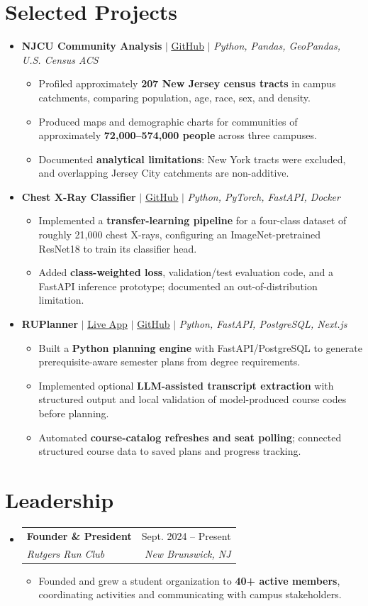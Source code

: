 \documentclass[letterpaper,10pt]{article}
\makeatletter
\newcommand{\resumeItem}[1]{\item\small{#1}}
\newcommand{\resumeSubheading}[4]{
  \vspace{1pt}\item
  \begin{tabular*}{0.97\textwidth}[t]{l@{\extracolsep{\fill}}r}
    \textbf{#1} & #2 \\
    \textit{\small #3} & \textit{\small #4} \\
  \end{tabular*}\vspace{-3pt}
}
\newcommand{\resumeProjectHeading}[1]{\vspace{3pt}\item\small{#1}\vspace{0pt}}
\newcommand{\resumeSubHeadingListStart}{\begin{itemize}[leftmargin=0.15in,label={},itemsep=0pt,topsep=0pt]}
\newcommand{\resumeSubHeadingListEnd}{\end{itemize}}
\newcommand{\resumeItemListStart}{\begin{itemize}[leftmargin=0.15in,label=\textbullet,itemsep=-2pt,topsep=0pt]}
\newcommand{\resumeItemListEnd}{\end{itemize}\vspace{0pt}}
\makeatother
\begin{document}
\section{Selected Projects}
\resumeSubHeadingListStart
  \resumeProjectHeading{\textbf{NJCU Community Analysis} $|$ \href{https://github.com/ameer-rah/njcu-community-analysis-internal}{\underline{GitHub}} $|$ \emph{Python, Pandas, GeoPandas, U.S. Census ACS}}
    \resumeItemListStart
      \resumeItem{Profiled approximately \textbf{207 New Jersey census tracts} in campus catchments, comparing population, age, race, sex, and density.}
      \resumeItem{Produced maps and demographic charts for communities of approximately \textbf{72,000--574,000 people} across three campuses.}
      \resumeItem{Documented \textbf{analytical limitations}: New York tracts were excluded, and overlapping Jersey City catchments are non-additive.}
    \resumeItemListEnd
  \resumeProjectHeading{\textbf{Chest X-Ray Classifier} $|$ \href{https://github.com/ameer-rah/chest-xray-classifier}{\underline{GitHub}} $|$ \emph{Python, PyTorch, FastAPI, Docker}}
    \resumeItemListStart
      \resumeItem{Implemented a \textbf{transfer-learning pipeline} for a four-class dataset of roughly 21,000 chest X-rays, configuring an ImageNet-pretrained ResNet18 to train its classifier head.}
      \resumeItem{Added \textbf{class-weighted loss}, validation/test evaluation code, and a FastAPI inference prototype; documented an out-of-distribution limitation.}
    \resumeItemListEnd
  \resumeProjectHeading{\textbf{RUPlanner} $|$ \href{https://ruplanner.app/}{\underline{Live App}} $|$ \href{https://github.com/ameer-rah/RUPlanner}{\underline{GitHub}} $|$ \emph{Python, FastAPI, PostgreSQL, Next.js}}
    \resumeItemListStart
      \resumeItem{Built a \textbf{Python planning engine} with FastAPI/PostgreSQL to generate prerequisite-aware semester plans from degree requirements.}
      \resumeItem{Implemented optional \textbf{LLM-assisted transcript extraction} with structured output and local validation of model-produced course codes before planning.}
      \resumeItem{Automated \textbf{course-catalog refreshes and seat polling}; connected structured course data to saved plans and progress tracking.}
    \resumeItemListEnd
\resumeSubHeadingListEnd

\section{Leadership}
\resumeSubHeadingListStart
  \resumeSubheading{Founder \& President}{Sept. 2024 -- Present}
    {Rutgers Run Club}{New Brunswick, NJ}
    \resumeItemListStart
      \resumeItem{Founded and grew a student organization to \textbf{40+ active members}, coordinating activities and communicating with campus stakeholders.}
    \resumeItemListEnd
\resumeSubHeadingListEnd
\end{document}
